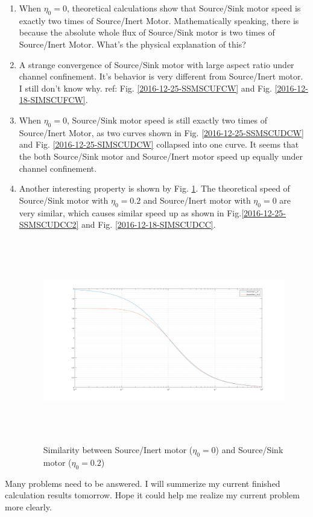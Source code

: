 \documentclass[fontsize=11pt, %
                             paper=a4, %
                             twoside, %
                             captions=tableheading,
                             index=totoc,
                             hyperref]{labbook}
\begin{document}
\begin{enumerate}
\item
When $\eta_0=0$, theoretical calculations show that Source/Sink motor speed is exactly two times of Source/Inert Motor. Mathematically speaking, there is because the absolute whole flux of Source/Sink motor is two times of Source/Inert Motor. What's the physical explanation of this?
\item
A strange convergence of Source/Sink motor with large aspect ratio under channel confinement. It's behavior is very different from Source/Inert motor. I still don't know why. ref: Fig. \ref{2016-12-25-SSMSCUFCW} and Fig. \ref{2016-12-18-SIMSCUFCW}.
\item
When $\eta_0=0$, Source/Sink motor speed is still exactly two times of Source/Inert Motor, as two curves shown in Fig. \ref{2016-12-25-SSMSCUDCW} and Fig. \ref{2016-12-25-SIMSCUDCW} collapsed into one curve. It seems that the both Source/Sink motor and Source/Inert motor speed up equally under channel confinement.
\item Another interesting property is shown by Fig. \ref{2016-12-25-SBSISS}. The theoretical speed of Source/Sink motor with $\eta_0=0.2$ and Source/Inert motor with $\eta_0=0$ are very similar, which causes similar speed up as shown in Fig.\ref{2016-12-25-SSMSCUDCC2} and Fig. \ref{2016-12-18-SIMSCUDCC}.
\begin{figure}
\centering
\includegraphics[width=\linewidth, height=3.5in]{2016-12-25-similar.png}
\caption{Similarity between Source/Inert motor ($\eta_0=0$) and Source/Sink motor ($\eta_0=0.2$)}\label{2016-12-25-SBSISS}
\end{figure}
\end{enumerate}
Many problems need to be answered. I will summerize my current finished calculation results tomorrow. Hope it could help me realize my current problem more clearly.






\end{document}
